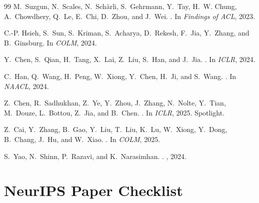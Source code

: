 \documentclass{article}
\begin{document}
\begin{thebibliography}{99}
M.~Suzgun, N.~Scales, N.~Sch{\"a}rli, S.~Gehrmann, Y.~Tay, H.~W. Chung,
  A.~Chowdhery, Q.~Le, E.~Chi, D.~Zhou, and J.~Wei.
.
\newblock In {\em Findings of ACL}, 2023.

C.-P. Hsieh, S.~Sun, S.~Kriman, S.~Acharya, D.~Rekesh, F.~Jia, Y.~Zhang, and
  B.~Ginsburg.
\newblock In {\em COLM}, 2024.

Y.~Chen, S.~Qian, H.~Tang, X.~Lai, Z.~Liu, S.~Han, and J.~Jia.
.
\newblock In {\em ICLR}, 2024.

C.~Han, Q.~Wang, H.~Peng, W.~Xiong, Y.~Chen, H.~Ji, and S.~Wang.
.
\newblock In {\em NAACL}, 2024.

Z.~Chen, R.~Sadhukhan, Z.~Ye, Y.~Zhou, J.~Zhang, N.~Nolte, Y.~Tian, M.~Douze,
  L.~Bottou, Z.~Jia, and B.~Chen.
.
\newblock In {\em ICLR}, 2025. Spotlight.

Z.~Cai, Y.~Zhang, B.~Gao, Y.~Liu, T.~Liu, K.~Lu, W.~Xiong, Y.~Dong,
  B.~Chang, J.~Hu, and W.~Xiao.
.
\newblock In {\em COLM}, 2025.

S.~Yao, N.~Shinn, P.~Razavi, and K.~Narasimhan.
.
, 2024.

\end{thebibliography}
\endgroup

\newpage
\section*{NeurIPS Paper Checklist}
\end{document}
